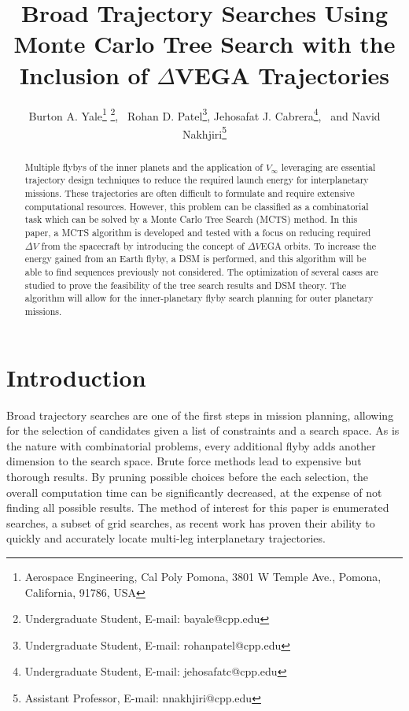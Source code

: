 \documentclass[letterpaper, preprint, paper,11pt]{AAS}	%
\begin{document}
\title{Broad Trajectory Searches Using Monte Carlo Tree Search with the Inclusion of $\Delta$VEGA Trajectories}

\author{Burton A. Yale\thanks{Aerospace Engineering, Cal Poly Pomona, 3801 W Temple Ave., Pomona, California, 91786, USA} \thanks{Undergraduate Student, E-mail: bayale@cpp.edu},
\ Rohan D. Patel\footnotemark[1] \thanks{Undergraduate Student, E-mail: rohanpatel@cpp.edu},  
Jehosafat J. Cabrera\footnotemark[1] \thanks{Undergraduate Student, E-mail: jehosafatc@cpp.edu},
\ and Navid Nakhjiri\footnotemark[1] \thanks{Assistant Professor, E-mail: nnakhjiri@cpp.edu}
}

\maketitle{} 		


\begin{abstract}
Multiple flybys of the inner planets and the application of $V_{\infty}$ leveraging are essential trajectory design techniques to reduce the required launch energy for interplanetary missions. These trajectories are often difficult to formulate and require extensive computational resources. However, this problem can be classified as a combinatorial task which can be solved by a Monte Carlo Tree Search (MCTS) method. In this paper, a MCTS algorithm is developed and tested with a focus on reducing required $\Delta V$ from the spacecraft by introducing the concept of $\Delta V$EGA orbits. To increase the energy gained from an Earth flyby, a DSM is performed, and this algorithm will be able to find sequences previously not considered. The optimization of several cases are studied to prove the feasibility of the tree search results and DSM theory. The algorithm will allow for the inner-planetary flyby search planning for outer planetary missions.
\end{abstract}

\section{Introduction}
Broad trajectory searches are one of the first steps in mission planning, allowing for the selection of candidates given a list of constraints and a search space. As is the nature with combinatorial problems, every additional flyby adds another dimension to the search space. Brute force methods lead to expensive but thorough results. By pruning possible choices before the each selection, the overall computation time can be significantly decreased, at the expense of not finding all possible results. The method of interest for this paper is enumerated searches, a subset of grid searches, as recent work has proven their ability to quickly and accurately locate multi-leg interplanetary trajectories\cite{Hennes2015}.
\end{document}
